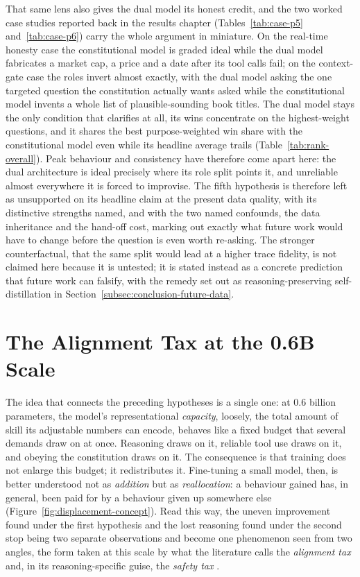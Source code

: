 That same lens also gives the dual model its honest credit, and the two worked case studies reported back in the results chapter (Tables~\ref{tab:case-p5} and~\ref{tab:case-p6}) carry the whole argument in miniature. On the real-time honesty case the constitutional model is graded ideal while the dual model fabricates a market cap, a price and a date after its tool calls fail; on the context-gate case the roles invert almost exactly, with the dual model asking the one targeted question the constitution actually wants asked while the constitutional model invents a whole list of plausible-sounding book titles. The dual model stays the only condition that clarifies at all, its wins concentrate on the highest-weight questions, and it shares the best purpose-weighted win share with the constitutional model even while its headline average trails (Table~\ref{tab:rank-overall}). Peak behaviour and consistency have therefore come apart here: the dual architecture is ideal precisely where its role split points it, and unreliable almost everywhere it is forced to improvise. The fifth hypothesis is therefore left as unsupported on its headline claim at the present data quality, with its distinctive strengths named, and with the two named confounds, the data inheritance and the hand-off cost, marking out exactly what future work would have to change before the question is even worth re-asking. The stronger counterfactual, that the same split would lead at a higher trace fidelity, is not claimed here because it is untested; it is stated instead as a concrete prediction that future work can falsify, with the remedy set out as reasoning-preserving self-distillation in Section~\ref{subsec:conclusion-future-data}.

\section{The Alignment Tax at the 0.6B Scale}
\label{sec:capacity-displacement-trade-off}

The idea that connects the preceding hypotheses is a single one: at 0.6 billion parameters, the model's representational \emph{capacity}, loosely, the total amount of skill its adjustable numbers can encode, behaves like a fixed budget that several demands draw on at once. Reasoning draws on it, reliable tool use draws on it, and obeying the constitution draws on it. The consequence is that training does not enlarge this budget; it redistributes it. Fine-tuning a small model, then, is better understood not as \emph{addition} but as \emph{reallocation}: a behaviour gained has, in general, been paid for by a behaviour given up somewhere else (Figure~\ref{fig:displacement-concept}). Read this way, the uneven improvement found under the first hypothesis and the lost reasoning found under the second stop being two separate observations and become one phenomenon seen from two angles, the form taken at this scale by what the literature calls the \emph{alignment tax} \cite{askell2021generallanguageassistantlaboratory, ouyang2022traininglanguagemodelsfollow} and, in its reasoning-specific guise, the \emph{safety tax} \cite{huang2025safetytaxsafetyalignment, fu2026reducingsafetytaxllm}.

